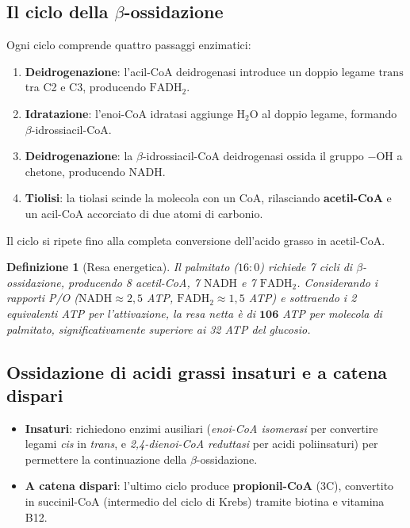 \documentclass[12pt,a4paper]{report}
\newtheorem{definizione}{Definizione}[section]
\begin{document}
\subsection{Il ciclo della \(\beta\)-ossidazione}
Ogni ciclo comprende quattro passaggi enzimatici:
\begin{enumerate}
\item \textbf{Deidrogenazione}: l'acil-CoA deidrogenasi introduce un doppio legame \(\mathrm{trans}\) tra C2 e C3, producendo \(\mathrm{FADH_2}\).
\item \textbf{Idratazione}: l'enoi-CoA idratasi aggiunge \(\mathrm{H_2O}\) al doppio legame, formando \(\beta\)-idrossiacil-CoA.
\item \textbf{Deidrogenazione}: la \(\beta\)-idrossiacil-CoA deidrogenasi ossida il gruppo \(-\mathrm{OH}\) a chetone, producendo \(\mathrm{NADH}\).
\item \textbf{Tiolisi}: la tiolasi scinde la molecola con un CoA, rilasciando \textbf{acetil-CoA} e un acil-CoA accorciato di due atomi di carbonio.
\end{enumerate}
Il ciclo si ripete fino alla completa conversione dell'acido grasso in acetil-CoA.
\begin{definizione}[Resa energetica]
Il palmitato (\(16:0\)) richiede 7 cicli di \(\beta\)-ossidazione, producendo 8 acetil-CoA, 7 \(\mathrm{NADH}\) e 7 \(\mathrm{FADH_2}\). Considerando i rapporti P/O (\(\mathrm{NADH} \approx 2{,}5\) ATP, \(\mathrm{FADH_2} \approx 1{,}5\) ATP) e sottraendo i 2 equivalenti ATP per l'attivazione, la resa netta è di \(\mathbf{106}\) ATP per molecola di palmitato, significativamente superiore ai 32 ATP del glucosio.
\end{definizione}
\subsection{Ossidazione di acidi grassi insaturi e a catena dispari}
\begin{itemize}
\item \textbf{Insaturi}: richiedono enzimi ausiliari (\textit{enoi-CoA isomerasi} per convertire legami \textit{cis} in \textit{trans}, e \textit{2,4-dienoi-CoA reduttasi} per acidi poliinsaturi) per permettere la continuazione della \(\beta\)-ossidazione.
\item \textbf{A catena dispari}: l'ultimo ciclo produce \textbf{propionil-CoA} (3C), convertito in succinil-CoA (intermedio del ciclo di Krebs) tramite biotina e vitamina B12.
\end{itemize}
\end{document}
